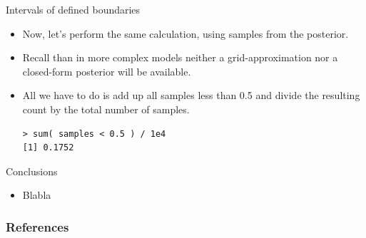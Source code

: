 \documentclass[handout]{beamer}
\begin{document}
\begin{frame}[fragile]{Intervals of defined boundaries}
\scriptsize{
\begin{itemize}

\item Now, let's perform the same calculation, using samples from the posterior.

\item Recall than in more complex models neither a grid-approximation nor a closed-form posterior will be available.

\item All we have to do is add up all samples less than 0.5 and divide the resulting count by the total number of samples.

\begin{verbatim}
> sum( samples < 0.5 ) / 1e4
[1] 0.1752 
\end{verbatim}



\end{itemize}



} 

\end{frame}

\begin{frame}{Conclusions}
\scriptsize{

\begin{itemize}
\item Blabla
\end{itemize}


} 
\end{frame}


\begin{frame}[allowframebreaks]\scriptsize
\frametitle{References}


%
\end{frame}  









\end{document}
